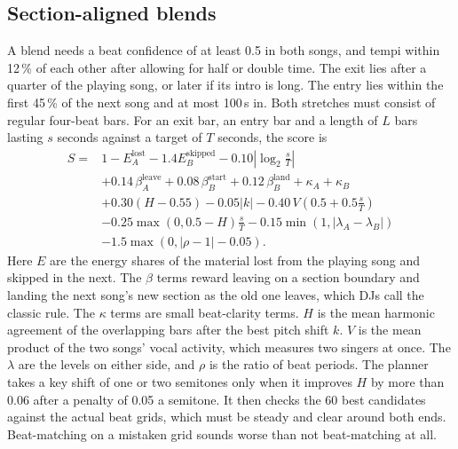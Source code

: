 \documentclass[conference,a4paper]{IEEEtran}
\newcommand{\q}[1]{\textquotedbl{}#1\textquotedbl{}}
\begin{document}
\subsection{Section-aligned blends}
A blend needs a beat confidence of at least 0.5 in both songs, and tempi within 12\,\% of each other
after allowing for half or double time. The exit lies after a quarter of the playing song, or
later if its intro is long. The entry lies within the first 45\,\% of the next song and at most
100\,s in. Both stretches must consist of regular four-beat bars. For an exit bar, an entry bar and
a length of $L$ bars lasting $s$ seconds against a target of $T$ seconds, the score is
\begin{align}
S={}&1-E^{\text{lost}}_A-1.4E^{\text{skipped}}_B-0.10\left|\log_2\tfrac{s}{T}\right|\nonumber\\
&+0.14\,\beta^{\text{leave}}_A+0.08\,\beta^{\text{start}}_B+0.12\,\beta^{\text{land}}_B+\kappa_A+\kappa_B\nonumber\\
&+0.30(H-0.55)-0.05|k|-0.40\,V\!\left(0.5+0.5\tfrac{s}{T}\right)\nonumber\\
&-0.25\max(0,0.5-H)\tfrac{s}{T}-0.15\min(1,|\lambda_A-\lambda_B|)\nonumber\\
&-1.5\max\!\left(0,|\rho-1|-0.05\right).
\end{align}
Here $E$ are the energy shares of the material lost from the playing song and skipped in the next.
The $\beta$ terms reward leaving on a section boundary and landing the next song's new section as
the old one leaves, which DJs call \q{the classic rule}. The $\kappa$ terms are small beat-clarity
terms. $H$ is the mean harmonic agreement of the overlapping bars after the best pitch shift $k$.
$V$ is the mean product of the two songs' vocal activity, which measures two singers at once. The
$\lambda$ are the levels on either side, and $\rho$ is the ratio of beat periods. The planner takes
a key shift of one or two semitones only when it improves $H$ by more than 0.06 after a penalty of
0.05 a semitone. It then checks the 60 best candidates against the actual beat grids, which must
be steady and clear around both ends. Beat-matching on a mistaken grid sounds worse than not
beat-matching at all.
\end{document}
